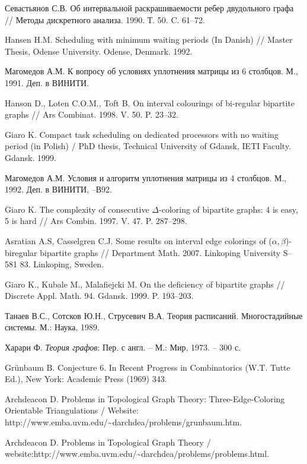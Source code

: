 \begin{thebibliography}{1}
{ Севастьянов С.В.} Об интервальной раскрашиваемости ребер двудольного графа // Методы дискретного анализа. 1990. Т. 50. C. 61--72.

{ Hansen H.M.} Scheduling with minimum waiting periods (In Danish) // Master Thesis, Odense University. Odense, Denmark. 1992.

{ Магомедов А.М.} К вопросу об условиях уплотнения матрицы из 6 столбцов. М., 1991. Деп. в ВИНИТИ.

{ Hanson D., Loten C.O.M., Toft B.} On interval colourings of bi-regular bipartite graphs // Ars Combinat. 1998. V. 50. P. 23--32.


{ Giaro K.} Compact task scheduling on dedicated processors with no waiting period (in Polish) / PhD thesis, Technical University of Gdansk, IETI Faculty. Gdansk. 1999.

{ Магомедов А.М.} Условия и алгоритм уплотнения матрицы из 4 столбцов. М., 1992. Деп. в ВИНИТИ, --В92.

{ Giaro K.} The complexity of consecutive $\Delta$-coloring of bipartite graphs: 4 is easy, 5 is hard // Ars Combin. 1997. V. 47. P. 287--298.

{ Asratian A.S, Casselgren C.J.} Some results on interval edge colorings of ($\alpha,\beta$)-biregular bipartite graphs // Department Math. 2007. Linkoping University S--581 83. Linkoping, Sweden.

{ Giaro K., Kubale M., Malafiejcki M.} On the deficiency of bipartite graphs // Discrete Appl. Math. 94. Gdansk. 1999. P. 193--203.

{ Танаев В.С., Сотсков Ю.Н., Струсевич В.А.} Теория расписаний. Многостадийные системы. М.: Наука, 1989.


Харари Ф. \textit{Теория графов}: Пер. с англ. -- М.: Мир, 1973. -- 300 с.

{Grünbaum B.} Conjecture 6. In Recent Progress in Combinatorics (W.T. Tutte Ed.), New York: Academic Press (1969) 343.

{Archdeacon D.} Problems in Topological Graph Theory: Three-Edge-Coloring Orientable Triangulations / Website: http://www.emba.uvm.edu/\~{}darchdea/problems/grunbaum.htm.

{Archdeacon D.} Problems in Topological Graph Theory / website:http://www.emba.uvm.edu/\~{}darchdea/problems/problems.html.


\end{thebibliography}
